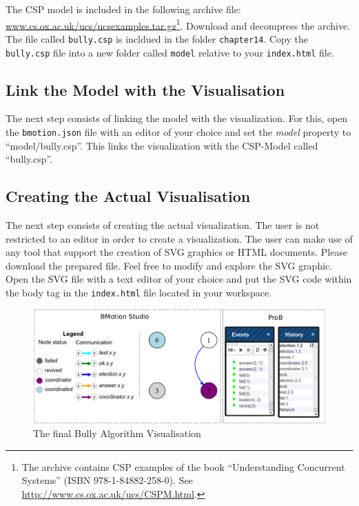 The CSP model is included in the following archive file: \url{www.cs.ox.ac.uk/ucs/ucsexamples.tar.gz}\footnote{The archive contains CSP examples of the book ``Understanding Concurrent Systems'' (ISBN 978-1-84882-258-0). See \url{http://www.cs.ox.ac.uk/ucs/CSPM.html}.}.
Download and decompress the archive.
The file called \texttt{bully.csp} is incldued in the folder \texttt{chapter14}.
Copy the \texttt{bully.csp} file into a new folder called \texttt{model} relative to your \texttt{index.html} file.

\subsection{Link the Model with the Visualisation}

The next step consists of linking the model with the visualization.
For this, open the \texttt{bmotion.json} file with an editor of your choice and set the \textit{model} property to ``model/bully.csp''.
This links the visualization with the CSP-Model called ``bully.csp''.

\subsection{Creating the Actual Visualisation}
\label{tutorial_csp_create_vis}

The next step consists of creating the actual visualization.
The user is not restricted to an editor in order to create a visualization.
The user can make use of any tool that support the creation of SVG graphics or HTML documents.
Please download the prepared  file.
Feel free to modify and explore the SVG graphic.
Open the SVG file with a text editor of your choice and put the SVG code within the body tag in the \texttt{index.html} file located in your workspace.

\begin{figure}[h!]\centering
	\includegraphics[width=16cm]{img/tutorial/runningvis}
	\caption{The final Bully Algorithm Visualisation}
	\label{fig:BullyVisState}
\end{figure}

